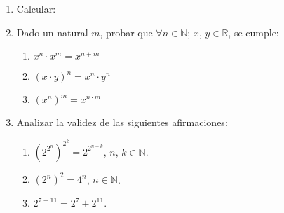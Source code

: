 \documentclass[a4paper,12pt,twoside,spanish,reqno]{amsbook}
\numberwithin{equation}{section}
\begin{document}
\begin{enumerate}

\item Calcular:

\item Dado un natural $m$, probar que $\forall n \in {\mathbb N} $; $x$, $y \in {\mathbb R}$, se cumple:
\begin{multicols}{3}
 \begin{enumerate}
  \item $x^n \cdot x^m = x^{n+m}$
\item $(x\cdot y)^n=x^n\cdot y^n$
\item $(x^n)^m = x^{n\cdot m}$
 \end{enumerate}
\end{multicols}

\item Analizar la validez de las siguientes afirmaciones:
 \begin{enumerate}
\item  $(2^{2^n})^{2^k} = 2^{2^{n+k}}$,  $n$, $k \in {\mathbb N}$.
\item $(2^n)^2 = 4^n$, $n \in {\mathbb N}$.
\item $2^{7+11} = 2^7 + 2^{11}$.
\end{enumerate}


\end{enumerate}
\end{document}
